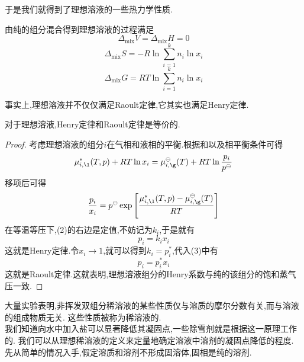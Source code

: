 \documentclass{ctexart}
\begin{document}
于是我们就得到了理想溶液的一些热力学性质.
\begin{theorem}[4C.2.1 理想溶液的热力学性质]
    由纯的组分混合得到理想溶液的过程满足
    \[\Delta_{\text{mix}}V=\Delta_{\text{mix}}H=0\]
    \[\Delta_{\text{mix}}S=-R\ln\sum_{i=1}^{k}n_i\ln x_i\]
    \[\Delta_{\text{mix}}G=RT\ln\sum_{i=1}^{k}n_i\ln x_i\]

\end{theorem}
事实上,理想溶液并不仅仅满足Raoult定律,它其实也满足Henry定律.
\begin{theorem}[4C.2.2 理想溶液的Henry定律与Raoult定律]
    对于理想溶液,Henry定律和Raoult定律是等价的.
\end{theorem}
\begin{proof}\setcounter{equation}{0}
    考虑理想溶液的组分$i$在气相和液相的平衡.根据和以及相平衡条件可得
    \begin{equation}
        \mu_{i,\l}^\ast(T,p)+RT\ln x_i=\mu_{i,\g}^\ominus(T)+RT\ln\dfrac{p_i}{p^\ominus}
    \end{equation}
    移项后可得
    \begin{equation}
        \dfrac{p_i}{x_i}=p^\ominus\exp\left[\dfrac{\mu_{i,\l}^\ast(T,p)-\mu_{i,\g}^\ominus(T)}{RT}\right]
    \end{equation}
    在等温等压下,(2)的右边是定值,不妨记为$k_i$,于是就有
    \begin{equation}
        p_i=k_ix_i
    \end{equation}
    这就是Henry定律.令$x_i\to1$,就可以得到$k_i=p_i^\ast$,代入(3)中有
    \begin{equation}
        p_i=p_i^\ast x_i
    \end{equation}
    这就是Raoult定律.这就表明,理想溶液组分的Henry系数与纯的该组分的饱和蒸气压一致.
\end{proof}
\vspace{8pt}
\indent 大量实验表明,非挥发双组分稀溶液的某些性质仅与溶质的摩尔分数有关,而与溶液的组成物质无关.%
这些性质被称为稀溶液的.\vspace{4pt}\\
\indent 我们知道向水中加入盐可以显著降低其凝固点,一些除雪剂就是根据这一原理工作的.%
我们可以从理想稀溶液的定义来定量地确定溶液中溶剂的凝固点降低的程度.\\
\indent 先从简单的情况入手,假定溶质和溶剂不形成固溶体,固相是纯的溶剂.
\end{document}
